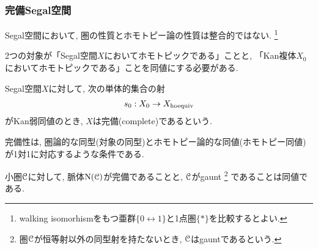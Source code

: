 \documentclass[aspectratio=169, dvipdfmx, 8pt, notheorems, uplatex]{beamer}
\begin{document}
\begin{frame}
  \frametitle{完備Segal空間}

  Segal空間において, 圏の性質とホモトピー論の性質は整合的ではない. 
  \footnote{
    walking isomorhismをもつ亜群$\{0 \leftrightarrow 1\}$と1点圏$\{\ast\}$を比較するとよい. 
  } 

  \begin{block}{}
    2つの対象が「Segal空間$X$においてホモトピックである」ことと, 「Kan複体$X_0$においてホモトピックである」ことを同値にする必要がある. 
  \end{block}

  \begin{definition}[完備Segal空間]
    Segal空間$X$に対して, 次の単体的集合の射
    \begin{align*}
      s_0 : X_0 \to X_{\mathrm{hoequiv}}
    \end{align*}
    がKan弱同値のとき, $X$は完備(complete)であるという. 
  \end{definition}

  完備性は, 圏論的な同型(対象の同型)とホモトピー論的な同値(ホモトピー同値)が1対1に対応するような条件である. 

  \begin{theorem}
    小圏$\mathcal{C}$に対して, 脈体$\mathrm{N}(\mathcal{C})$が完備であることと, $\mathcal{C}$がgaunt
    \footnote{
      圏$\mathcal{C}$が恒等射以外の同型射を持たないとき, $\mathcal{C}$はgauntであるという. 
    }
    であることは同値である. 
  \end{theorem}

\end{frame}

\end{document}
